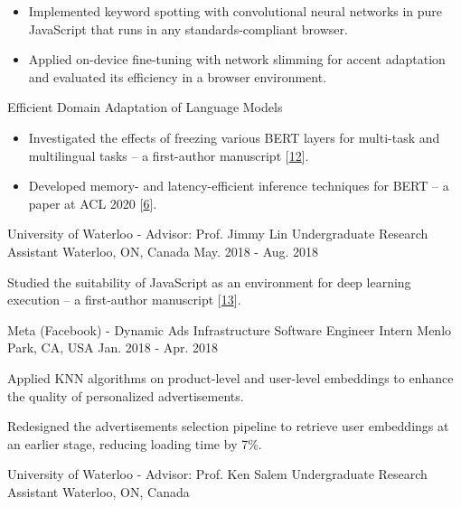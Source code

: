 \begin{cventries}
{\begin{cvitems}
\begin{itemize}[label=$\cdot$,leftmargin=0.7em]
\item {Implemented keyword spotting with convolutional neural networks in pure JavaScript that runs in any standards-compliant browser.}
\item {Applied on-device fine-tuning with network slimming for accent adaptation and evaluated its efficiency in a browser environment.}
\end{itemize}
\item {Efficient Domain Adaptation of Language Models}
\begin{itemize}[label=$\cdot$,leftmargin=0.7em]
\item {Investigated the effects of freezing various BERT layers for multi-task and multilingual tasks -- a first-author manuscript [\hyperlink{Elsa:arXiv}{12}].}
\item {Developed memory- and latency-efficient inference techniques for BERT -- a paper at ACL 2020 [\hyperlink{DeeBERT:ACL}{6}].}
\end{itemize}
\end{cvitems}
}
\cventry
{University of Waterloo - Advisor: Prof. Jimmy Lin} %
{Undergraduate Research Assistant} %
{Waterloo, ON, Canada} %
{May. 2018 - Aug. 2018} %
{ %
\begin{cvitems}
\item {Studied the suitability of JavaScript as an environment for deep learning execution -- a first-author manuscript [\hyperlink{JavaScript:arXiv}{13}].}
\end{cvitems}
}
\cventry
{Meta (Facebook) - Dynamic Ads Infrastructure} %
{Software Engineer Intern} %
{Menlo Park, CA, USA} %
{Jan. 2018 - Apr. 2018} %
{ %
\begin{cvitems}
\item {Applied KNN algorithms on product-level and user-level embeddings to enhance the quality of personalized advertisements.}
\item {Redesigned the advertisements selection pipeline to retrieve user embeddings at an earlier stage, reducing loading time by 7\%.}
\end{cvitems}
}
\cventry
{University of Waterloo - Advisor: Prof. Ken Salem} %
{Undergraduate Research Assistant} %
{Waterloo, ON, Canada} %

\end{cventries}
